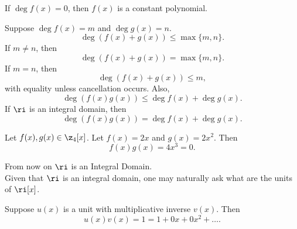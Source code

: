 
If $\deg f(x)=0$, then $f(x)$ is a constant polynomial.

\begin{proposition}{
    Suppose $\deg f(x)=m$ and $\deg g(x)=n$.
}
    \[
        \deg(f(x)+g(x)) \leq \max\{m,n\}.
    \]
    If $m\neq n$, then
    \[
        \deg(f(x)+g(x)) = \max\{m,n\}.
    \]
    If $m=n$, then
    \[
        \deg(f(x)+g(x)) \leq m,
    \]
    with equality unless cancellation occurs.
    Also,
    \[
        \deg(f(x)g(x)) \leq \deg f(x) + \deg g(x).
    \]
    If $\ri$ is an integral domain, then
    \[
        \deg(f(x)g(x)) = \deg f(x) + \deg g(x).
    \]
\end{proposition}

Let $f(x),g(x)\in\z_4[x]$.
Let $f(x)=2x$ and $g(x)=2x^2$.
Then
\[
    f(x)g(x)=4x^3=0.
\]

    {\Huge{From now on $\ri$ is an Integral Domain.}}\\Given that $\ri$ is an integral domain, one may naturally ask what are the units of $\ri[x]$.

\begin{lemma*}{
    Suppose $u(x)$ is a unit with multiplicative inverse $v(x)$.
    Then
    \[
        u(x)v(x)=1=1+0x+0x^2+\hdots.
    \]
}
\end{lemma*}